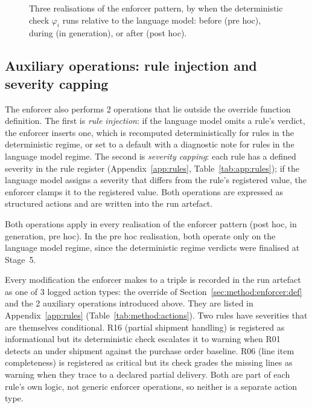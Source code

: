 \begin{figure}[htbp]
\centering

\caption{Three realisations of the enforcer pattern, by when the deterministic check $\varphi_i$ runs relative to the language model: before (pre hoc), during (in generation), or after (post hoc).}
\label{fig:method:realisations}
\end{figure}

\subsection{Auxiliary operations: rule injection and severity capping}
\label{sec:method:enforcer:aux}

The enforcer also performs 2 operations that lie outside the override function definition. The first is \emph{rule injection}: if the language model omits a rule's verdict, the enforcer inserts one, which is recomputed deterministically for rules in the deterministic regime, or set to a default with a diagnostic note for rules in the language model regime. The second is \emph{severity capping}: each rule has a defined severity in the rule register (Appendix~\ref{app:rules}, Table~\ref{tab:app:rules}); if the language model assigns a severity that differs from the rule's registered value, the enforcer clamps it to the registered value. Both operations are expressed as structured actions and are written into the run artefact.

Both operations apply in every realisation of the enforcer pattern (post hoc, in generation, pre hoc). In the pre hoc realisation, both operate only on the language model regime, since the deterministic regime verdicts were finalised at Stage~5.

Every modification the enforcer makes to a triple is recorded in the run artefact as one of 3 logged action types: the override of Section~\ref{sec:method:enforcer:def} and the 2 auxiliary operations introduced above. They are listed in Appendix~\ref{app:rules} (Table~\ref{tab:method:actions}). Two rules have severities that are themselves conditional. R16 (partial shipment handling) is registered as informational but its deterministic check escalates it to warning when R01 detects an under shipment against the purchase order baseline. R06 (line item completeness) is registered as critical but its check grades the missing lines as warning when they trace to a declared partial delivery. Both are part of each rule's own logic, not generic enforcer operations, so neither is a separate action type.

